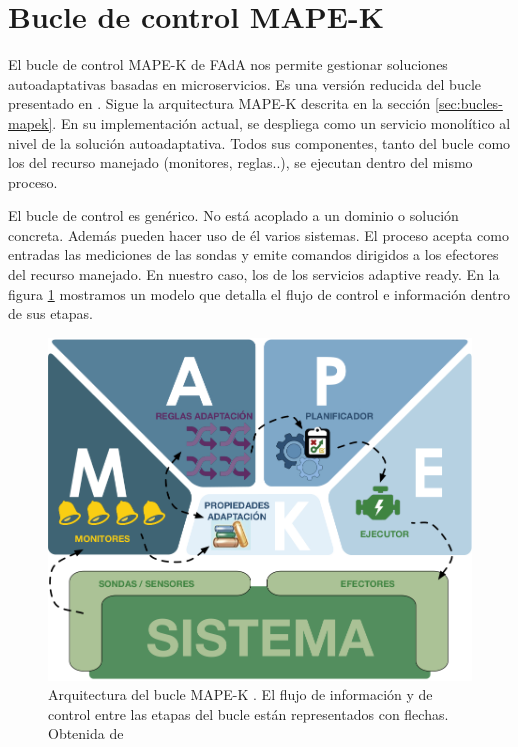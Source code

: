 \section{Bucle de control MAPE-K }

El bucle de control MAPE-K  de FAdA nos permite gestionar soluciones autoadaptativas basadas en microservicios. Es una versión reducida del bucle presentado en \cite{fonsServiciosAdaptivereadyPara2021}. Sigue la arquitectura MAPE-K descrita en la sección \ref{sec:bucles-mapek}. En su implementación actual, se despliega como un servicio monolítico al nivel de la solución autoadaptativa. Todos sus componentes, tanto del bucle como los del recurso manejado (monitores, reglas..), se ejecutan dentro del mismo proceso.

El bucle de control es genérico. No está acoplado a un dominio o solución concreta. Además pueden hacer uso de él varios sistemas. El proceso acepta como entradas las mediciones de las sondas y emite comandos dirigidos a los efectores del recurso manejado. En nuestro caso, los  de los servicios adaptive ready. En la figura \ref{fig:bucle-mapek3} mostramos un modelo que detalla el flujo de control e información dentro de sus etapas.

\begin{figure}[htb]
  \centering
  \includegraphics[scale=1]{cap_introduccion/images/bucle-mape-k}
  \caption[Arquitectura del bucle MAPE-K . El flujo de información y de control entre las etapas del bucle están representados con flechas.]{Arquitectura del bucle MAPE-K . El flujo de información y de control entre las etapas del bucle están representados con flechas. Obtenida de \cite{fonsEspecificacionSistemasAutoadaptativos2021}}
  \label{fig:bucle-mapek3}
\end{figure}

